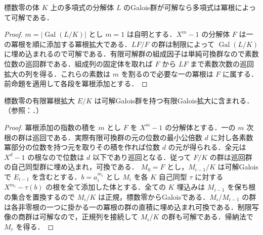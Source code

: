 \begin{prop}[可解Galois群と冪根可解性]
標数零の体 $K$ 上の多項式の分解体 $L$ のGalois群が可解なら多項式は冪根によって可解である．
\end{prop}
\begin{proof}
$m=|\operatorname{Gal}(L/K)|$ とし $m=1$ は自明とする．$X^m-1$ の分解体 $F$ は一の冪根を順に添加する冪根拡大である．$LF/F$ の群は制限によって $\operatorname{Gal}(L/K)$ に埋め込まれるので可解である．有限可解群の組成因子は単純可換群なので素数位数の巡回群である．組成列の固定体を取れば $F$ から $LF$ まで素数次数の巡回拡大の列を得る．これらの素数は $m$ を割るので必要な一の冪根は $F$ に属する．前命題を適用して各段を冪根添加とする．
\end{proof}
\begin{prop}[冪根拡大の可解Galois拡大への埋込み]
標数零の有限冪根拡大 $E/K$ は可解Galois群を持つ有限Galois拡大に含まれる．（参照：．）
\end{prop}
\begin{proof}
冪根添加の指数の積を $m$ とし $F$ を $X^m-1$ の分解体とする．一の $m$ 次根の群は巡回である．実際有限可換群の元の位数の最小公倍数 $d$ に対し各素数冪部分の位数を持つ元を取りその積を作れば位数 $d$ の元が得られる．全元は $X^d-1$ の根なので位数は $d$ 以下であり巡回となる．従って $F/K$ の群は巡回群の自己同型群に埋め込まれ，可換である．
$M_0=F$ とし，$M_{i-1}/K$ は可解Galoisで $E_{i-1}$ を含むとする．$b=a_i^{m_i}$ とし $M_i$ を各 $K$ 自己同型 $\tau$ に対する $X^{m_i}-\tau(b)$ の根を全て添加した体とする．全ての $K$ 埋込みは $M_{i-1}$ を保ち根の集合を置換するので $M_i/K$ は正規，標数零からGaloisである．$M_i/M_{i-1}$ の群は各非零根の一つに掛かる一の冪根の群の直積に埋め込まれ可換である．制限写像の商群は可解なので，正規列を接続して $M_i/K$ の群も可解である．帰納法で $M_r$ を得る．
\end{proof}
